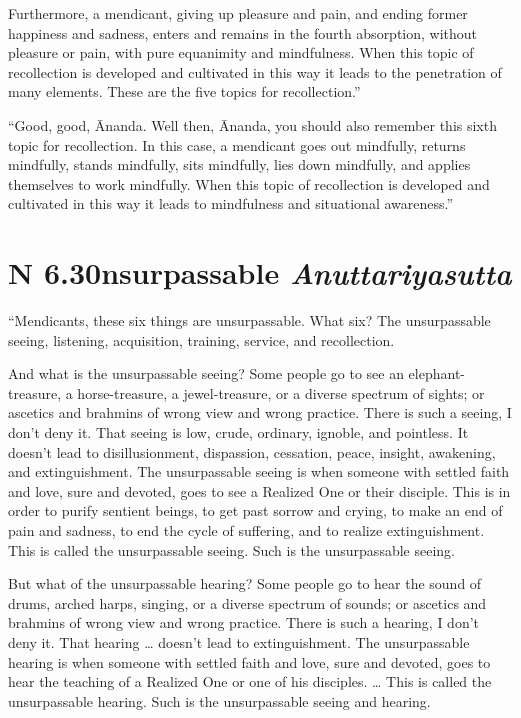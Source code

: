 \documentclass[12pt,openany]{book}%
\newcommand*{\suttatitleacronym}[1]{\smaller[2]{#1}\vspace*{.3em}}
\newcommand*{\suttatitletranslation}[1]{\linebreak{#1}}
\newcommand*{\suttatitleroot}[1]{\linebreak\smaller[2]\itshape{#1}}
\newcommand*{\tocacronym}[1]{\hspace*{-3.3em}{#1}\quad}
\newcommand*{\toctranslation}[1]{#1}
\newcommand*{\tocroot}[1]{(\textit{#1})}
\begin{document}
Furthermore, a mendicant, giving up pleasure and pain, and ending former happiness and sadness, enters and remains in the fourth absorption, without pleasure or pain, with pure equanimity and mindfulness. When this topic of recollection is developed and cultivated in this way it leads to the penetration of many elements. These are the five topics for recollection.” 

“Good, good, Ānanda. Well then, Ānanda, you should also remember this sixth topic for recollection. In this case, a mendicant goes out mindfully, returns mindfully, stands mindfully, sits mindfully, lies down mindfully, and applies themselves to work mindfully. When this topic of recollection is developed and cultivated in this way it leads to mindfulness and situational awareness.” 

%
\section*{{\suttatitleacronym AN 6.30}{\suttatitletranslation Unsurpassable }{\suttatitleroot Anuttariyasutta}}
\addcontentsline{toc}{section}{\tocacronym{AN 6.30} \toctranslation{Unsurpassable } \tocroot{Anuttariyasutta}}

“Mendicants, these six things are unsurpassable. What six? The unsurpassable seeing, listening, acquisition, training, service, and recollection. 

And what is the unsurpassable seeing? Some people go to see an elephant-treasure, a horse-treasure, a jewel-treasure, or a diverse spectrum of sights; or ascetics and brahmins of wrong view and wrong practice. There is such a seeing, I don’t deny it. That seeing is low, crude, ordinary, ignoble, and pointless. It doesn’t lead to disillusionment, dispassion, cessation, peace, insight, awakening, and extinguishment. The unsurpassable seeing is when someone with settled faith and love, sure and devoted, goes to see a Realized One or their disciple. This is in order to purify sentient beings, to get past sorrow and crying, to make an end of pain and sadness, to end the cycle of suffering, and to realize extinguishment. This is called the unsurpassable seeing. Such is the unsurpassable seeing. 

But what of the unsurpassable hearing? Some people go to hear the sound of drums, arched harps, singing, or a diverse spectrum of sounds; or ascetics and brahmins of wrong view and wrong practice. There is such a hearing, I don’t deny it. That hearing … doesn’t lead to extinguishment. The unsurpassable hearing is when someone with settled faith and love, sure and devoted, goes to hear the teaching of a Realized One or one of his disciples. … This is called the unsurpassable hearing. Such is the unsurpassable seeing and hearing. 
\end{document}
